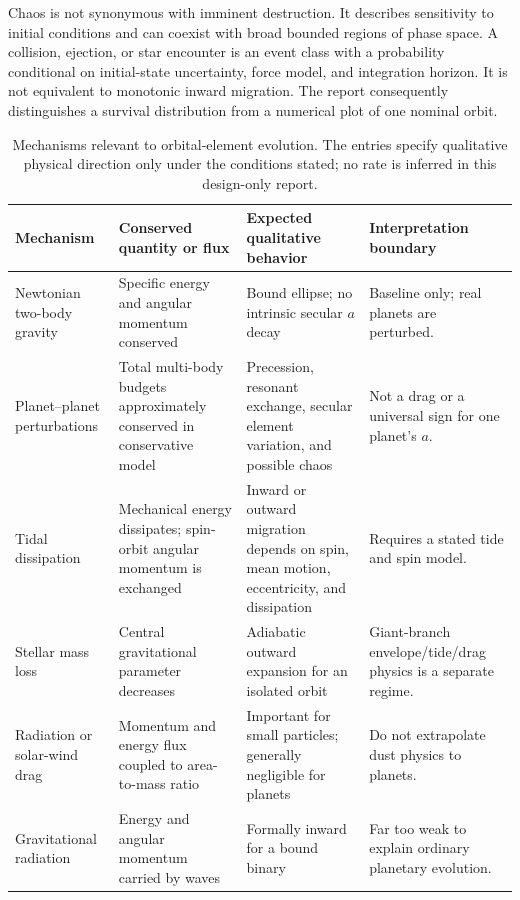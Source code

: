 \documentclass[10pt,conference]{IEEEtran}
\begin{document}
Chaos is not synonymous with imminent destruction. It describes sensitivity to initial conditions and can coexist with broad bounded regions of phase space. A collision, ejection, or star encounter is an event class with a probability conditional on initial-state uncertainty, force model, and integration horizon. It is not equivalent to monotonic inward migration. The report consequently distinguishes a survival distribution from a numerical plot of one nominal orbit.

\begin{table}[!t]
\caption{Mechanisms relevant to orbital-element evolution. The entries specify qualitative physical direction only under the conditions stated; no rate is inferred in this design-only report.}
\label{tab:mechanism-map}
\centering
\footnotesize
\setlength{\tabcolsep}{2.5pt}
\begin{tabular}{p{}p{}p{}p{}}
\toprule
Mechanism & Conserved quantity or flux & Expected qualitative behavior & Interpretation boundary \\
\midrule
Newtonian two-body gravity & Specific energy and angular momentum conserved & Bound ellipse; no intrinsic secular $a$ decay & Baseline only; real planets are perturbed. \\
Planet--planet perturbations & Total multi-body budgets approximately conserved in conservative model & Precession, resonant exchange, secular element variation, and possible chaos & Not a drag or a universal sign for one planet's $a$. \\
Tidal dissipation & Mechanical energy dissipates; spin-orbit angular momentum is exchanged & Inward or outward migration depends on spin, mean motion, eccentricity, and dissipation & Requires a stated tide and spin model. \\
Stellar mass loss & Central gravitational parameter decreases & Adiabatic outward expansion for an isolated orbit & Giant-branch envelope/tide/drag physics is a separate regime. \\
Radiation or solar-wind drag & Momentum and energy flux coupled to area-to-mass ratio & Important for small particles; generally negligible for planets & Do not extrapolate dust physics to planets. \\
Gravitational radiation & Energy and angular momentum carried by waves & Formally inward for a bound binary & Far too weak to explain ordinary planetary evolution. \\
\bottomrule
\end{tabular}
\end{table}
\end{document}
